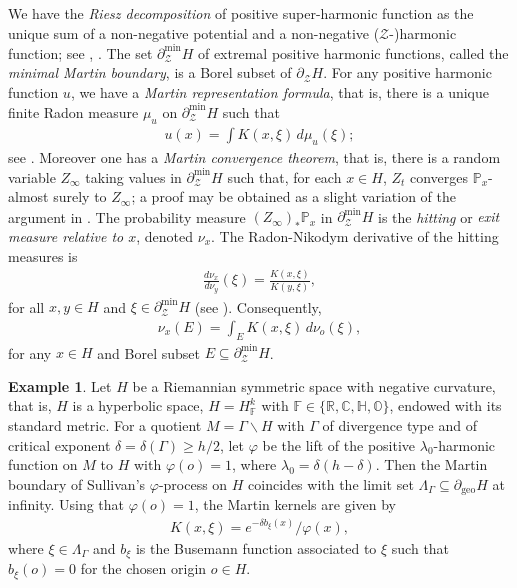 \documentclass[12pt,a4paper]{amsart}
\numberwithin{equation}{section}
\theoremstyle{definition}
\newtheorem{exa}[equation]{Example}
\DeclareMathOperator{\geo}{geo}
\def\C{\mathbb C}
\def\F{\mathbb F}
\def\H{\mathbb H}
\def\O{\mathbb O}
\def\p{\mathbb P}
\def\R{\mathbb R}
\def\vf{\varphi}
\begin{document}
We have the \emph{Riesz decomposition} of positive super-harmonic function as the unique sum of a non-negative potential and a non-negative ($\mathcal{Z}$-)harmonic function; see \cite{KunWata}, \cite{KunWatp}.
The set $\partial_{\mathcal{Z}}^{\min}H$ of extremal positive harmonic functions, called the \emph{minimal Martin boundary}, is a Borel subset of $\partial_{\mathcal{Z}}H$.
For any positive harmonic function $u$, we have a \emph{Martin representation formula}, that is, there is a unique finite Radon measure $\mu_u$ on $\partial_{\mathcal{Z}}^{\min}H$ such that
\begin{align*}
	u(x)=\int K(x,\xi)\,d\mu_u(\xi);
\end{align*}
see \cite[Theorem 4]{KunWatp}.
Moreover one has a \emph{Martin convergence theorem}, that is, there is a random variable $Z_\infty$ taking values in $\partial_{\mathcal{Z}}^{\min}H$ such that, for each $x\in H$, $Z_t$ converges $\p_x$-almost surely to $Z_\infty$;
a proof may be obtained as a slight variation of the argument in \cite[Theorem 5.1]{Saw}.
The probability measure $(Z_\infty)_\ast \p_x$ in $\partial_{\mathcal{Z}}^{\min}H$ is the \emph{hitting} or \emph{exit measure relative to $x$}, denoted $\nu_x$.
The Radon-Nikodym derivative of the hitting measures is
\begin{align*}
	\frac{d\nu_x}{d\nu_y}(\xi)=\frac{K(x,\xi)}{K(y,\xi)},
\end{align*}
for all $x,y\in H$ and $\xi\in\partial_{\mathcal{Z}}^{\min}H$ (see \cite[Eq. 12.4, Proposition 12.11]{KunWatp}). Consequently, 
\begin{align*}
	\nu_x(E)=\int_E K(x,\xi) \,d\nu_{o}(\xi),
\end{align*}
for any $x\in H$ and Borel subset $E\subseteq\partial_{\mathcal{Z}}^{\min}H$. 

\begin{exa}\label{SullMart}
Let $H$ be a Riemannian symmetric space with negative  curvature,
that is, $H$ is a hyperbolic space, $H=H_\F^k$ with $\F\in\{\R,\C,\H,\O\}$, endowed with its standard metric.
For a quotient $M=\Gamma\backslash H$ with $\Gamma$ of divergence type and of critical exponent $\delta=\delta(\Gamma)\ge h/2$,
let $\vf$ be the lift of the positive $\lambda_0$-harmonic function on $M$ to $H$ with $\vf(o)=1$, where $\lambda_0=\delta(h-\delta)$.
Then the Martin boundary of Sullivan's $\vf$-process on $H$ coincides with the limit set $\Lambda_\Gamma\subseteq\partial_{\geo}H$ at infinity.
Using that $\vf(o)=1$, the Martin kernels are given by
\begin{align*}
    K(x,\xi) = e^{-\delta b_\xi(x)}/\vf(x),
\end{align*}
where $\xi\in\Lambda_\Gamma$ and $b_\xi$ is the Busemann function associated to $\xi$ such that $b_\xi(o)=0$ for the chosen origin $o\in H$.
\end{exa}
\end{document}
